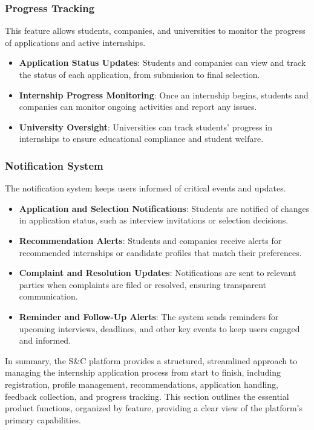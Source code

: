 \subsubsection*{Progress Tracking} 
This feature allows students, companies, and universities to monitor the progress of applications and active internships.
\begin{itemize}
    \item \textbf{Application Status Updates}: Students and companies can view and track the status of each application, from submission to final selection.
    \item \textbf{Internship Progress Monitoring}: Once an internship begins, students and companies can monitor ongoing activities and report any issues.
    \item \textbf{University Oversight}: Universities can track students’ progress in internships to ensure educational compliance and student welfare.
\end{itemize}

\subsubsection*{Notification System} 
The notification system keeps users informed of critical events and updates.
\begin{itemize}
    \item \textbf{Application and Selection Notifications}: Students are notified of changes in application status, such as interview invitations or selection decisions.
    \item \textbf{Recommendation Alerts}: Students and companies receive alerts for recommended internships or candidate profiles that match their preferences.
    \item \textbf{Complaint and Resolution Updates}: Notifications are sent to relevant parties when complaints are filed or resolved, ensuring transparent communication.
    \item \textbf{Reminder and Follow-Up Alerts}: The system sends reminders for upcoming interviews, deadlines, and other key events to keep users engaged and informed.
\end{itemize}

In summary, the S\&C platform provides a structured, streamlined approach to managing the internship application process from start to finish, including registration, profile management, recommendations, application handling, feedback collection, and progress tracking. This section outlines the essential product functions, organized by feature, providing a clear view of the platform’s primary capabilities.




